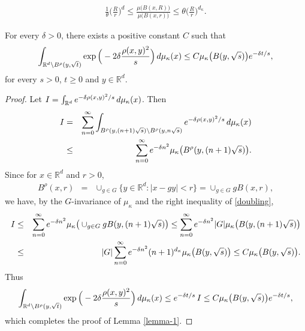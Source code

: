 \documentclass[10pt,a4paper]{amsart}
\def\R{\mathbb{R}}
\def\d{\textup{d}}
\begin{document}
\begin{eqnarray}\label{doubling}
\frac{1}{\theta}\Big(\frac{R}{r}\Big)^{d}\leq\frac{\mu\big(B(x,R)\big)}{\mu\big(B(x,r)\big)}\leq \theta\Big(\frac{R}{r}\Big)^{d_\kappa}.
\end{eqnarray}

\begin{lemma}\label{lemma-1}
For every $\delta>0$, there exists a positive constant $C$ such that
$$\int_{\R^d\setminus B^\rho(y,\sqrt{t})}\exp\Big(-2\delta\frac{\rho(x,y)^2}{s}\Big)\,\d\mu_\kappa(x)\leq C \mu_\kappa\big(B(y,\sqrt{s})\big)e^{-\delta t/s},$$
for every $s>0$, $t\geq0$ and $y\in\R^d$.
\end{lemma}

\begin{proof} Let ${\rm I}=\int_{\R^d}e^{-\delta\rho(x,y)^2/s}\,\d\mu_\kappa(x)$. Then
\begin{eqnarray*}
{\rm I}&=&\sum_{n=0}^\infty\int_{B^\rho(y,(n+1)\sqrt{s})\setminus B^\rho(y,n\sqrt{s})}e^{-\delta\rho(x,y)^2/s}\,\d\mu_\kappa(x)\\
&\leq&\sum_{n=0}^\infty e^{-\delta n^2}\mu_{\kappa}\big(B^\rho(y,(n+1)\sqrt{s})\big).
\end{eqnarray*}
Since for $x\in\R^d$ and $r>0$,
\begin{eqnarray*}
B^\rho(x,r)&=&\cup_{g\in G}\{y\in\R^d:|x-gy|<r\}
=\cup_{g\in G}g B(x,r),
 \end{eqnarray*}
we have, by the $G$-invariance of $\mu_\kappa$ and the right inequality of \eqref{doubling},
\begin{eqnarray*}
{\rm I}&\leq&\sum_{n=0}^\infty e^{-\delta n^2}\mu_{\kappa}\big(\cup_{g\in G} gB(y,(n+1)\sqrt{s})\big)\leq \sum_{n=0}^\infty e^{-\delta n^2}|G|\mu_{\kappa}\big(B(y,(n+1)\sqrt{s})\big)\\
&\leq&|G|\sum_{n=0}^\infty e^{-\delta n^2}(n+1)^{d_\kappa}\mu_\kappa\big(B(y,\sqrt{s})\big)\leq C\mu_\kappa\big(B(y,\sqrt{s})\big).
\end{eqnarray*}
Thus
$$\int_{\R^d\setminus B^\rho(y,\sqrt{t})}\exp\Big(-2\delta\frac{\rho(x,y)^2}{s}\Big)\,\d\mu_\kappa(x)\leq e^{-\delta t/s}\, {\rm I}
\leq C\mu_\kappa\big(B(y,\sqrt{s})\big)e^{-\delta t/s},$$
which completes the proof of Lemma \ref{lemma-1}.
\end{proof}
\end{document}
